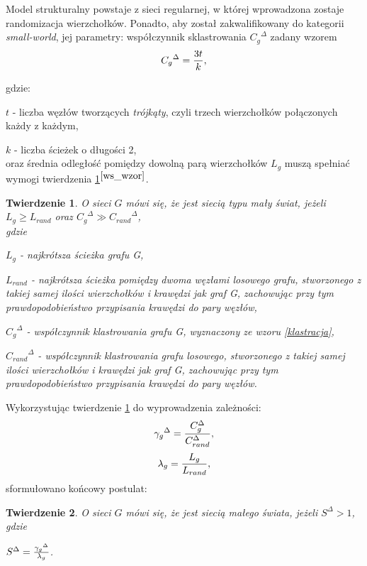 \documentclass[a4paper, 12pt, twoside, openright]{article}
\newtheorem{theorem}{Twierdzenie}
\begin{document}
	Model strukturalny powstaje z sieci regularnej, w której wprowadzona zostaje randomizacja wierzchołków. Ponadto, aby został zakwalifikowany do kategorii \textit{small-world}, jej parametry: współczynnik sklastrowania ${C_g}^{\Delta}$ zadany wzorem
	\begin{equation}
		\label{klastracja}
		{C_g}^{\Delta}  = {{3t} \over {k}},
	\end{equation}
	\par gdzie:\indent\par 
	$t$ - liczba węzłów tworzących \textit{trójkąty}, czyli trzech wierzchołków połączonych każdy z każdym,\indent\par
	$k$ - liczba ścieżek o długości 2,\\
	 oraz średnia odległość pomiędzy dowolną parą wierzchołków $L_g$ muszą spełniać wymogi twierdzenia \ref{ctwWS}$^{\cite{ws_wzor}}$. 
	\newpage
	\begin{theorem}
		\label{ctwWS}
		O sieci $G$ mówi się, że jest siecią typu \textit{mały świat}, jeżeli $L_g \ge L_{rand}$ oraz ${C_g}^{\Delta} \gg {C_{rand}}^{\Delta}$, \\gdzie\indent\par
		$L_g$ - najkrótsza ścieżka grafu G,\indent\par
		$L_{rand}$ - najkrótsza ścieżka pomiędzy dwoma węzłami losowego grafu, stworzonego z takiej samej ilości wierzchołków i krawędzi jak graf G, zachowując przy tym prawdopodobieństwo przypisania krawędzi do pary węzłów,\indent\par
		${C_g}^{\Delta}$ - współczynnik klastrowania grafu G, wyznaczony ze wzoru \ref{klastracja},\indent\par
		${C_{rand}}^{\Delta}$ - współczynnik klastrowania grafu losowego, stworzonego z takiej samej ilości wierzchołków i krawędzi jak graf G, zachowując przy tym prawdopodobieństwo przypisania krawędzi do pary węzłów.
	\end{theorem}
	Wykorzystując twierdzenie \ref{ctwWS} do wyprowadzenia zależności:
	\begin{equation}
	 	\label{gamma}
		{\gamma_g}^{\Delta} = {{C_g^{\Delta}} \over {C_{rand}^{\Delta}}},
	\end{equation}
 	\begin{equation}
	 	\label{lambda}
	 	{\lambda_g}  = {{L_g} \over {L_{rand}}},
 	\end{equation}
	 sformułowano końcowy postulat:
	\begin{theorem}
		\label{twWS}
		O sieci $G$ mówi się, że jest siecią \textit{małego świata}, jeżeli ${S}^{\Delta} > 1$, \\gdzie \indent\par${S}^{\Delta} = {{{\gamma_g}^{\Delta}} \over {\lambda_g}}$.
	\end{theorem}
\end{document}
